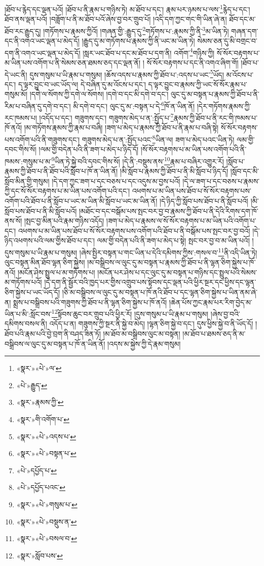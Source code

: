།ཐོབ་པ་རྙེད་དང་ལྡན་པའོ། །ཐོབ་པ་ནི་རྣམ་པ་གཉིས་ཏེ། མ་ཐོབ་པ་དང་། རྣམ་པར་ཉམས་པ་ལས་\footnote{«སྣར་»«པེ་»ལ་}རྙེད་པ་དང་། ཐོབ་ནས་ལྡན་པའོ། །བཟློག་པ་ནི་མ་ཐོབ་པའོ་ཞེས་བྱ་བར་གྲུབ་པོ། །འདི་དག་ཀྱང་གང་གི་ཡིན་ཞེ་ན། ཐོབ་དང་མ་ཐོབ་རང་རྒྱུད་དུ། །གཏོགས་པ་རྣམས་ཀྱིའོ། །གཞན་གྱི་:རྒྱུད་དུ་\footnote{«པེ་»རྒྱུད་}གཏོགས་པ་:རྣམས་ཀྱི་ནི་\footnote{«སྣར་»རྣམས་ཀྱི་}མ་ཡིན་ཏེ། གཞན་དག་དང་ནི་འགའ་ཡང་ལྡན་པ་མེད་དོ། །རྒྱུད་དུ་མ་གཏོགས་པ་རྣམས་ཀྱི་ནི་ཡང་མ་ཡིན་ཏེ། སེམས་ཅན་དུ་མི་བགྲང་བ་དག་ནི་འགའ་ཡང་ལྡན་པ་མེད་དོ། །སླར་ཡང་ཐོབ་པ་དང་མ་ཐོབ་པ་དག་ནི། འགོག་\footnote{«སྣར་»གི་འགོག་པ་}གཉིས་ཀྱི། སོ་སོར་བརྟགས་པ་མ་ཡིན་པས་འགོག་པ་ནི་སེམས་ཅན་ཐམས་ཅད་དང་ལྡན་ནོ། །
སོ་སོར་བརྟགས་པ་དང་ནི་འགའ་ཞིག་གོ། །ཐོབ་པ་དེ་ཡང་ནི། དུས་གསུམ་པ་ཡི་རྣམ་པ་གསུམ། །ཆོས་འདས་པ་རྣམས་ཀྱི་ཐོབ་པ་:འདས་པ་ཡང་\footnote{«སྣར་»«པེ་»འདས་པ་}ཡོད། མ་འོངས་པ་དང་། ད་ལྟར་བྱུང་བ་ཡང་ཡོད་ལ། དེ་བཞིན་དུ་མ་འོངས་པ་དང་། ད་ལྟར་བྱུང་བ་རྣམས་ཀྱི་ཡང་སོ་སོར་རྣམ་པ་གསུམ་མོ། །དགེ་ལ་སོགས་ཀྱི་དགེ་ལ་སོགས། །དགེ་བ་དང་མི་དགེ་བ་དང་། ལུང་དུ་མ་བསྟན་པ་རྣམས་ཀྱི་ཐོབ་པ་ནི་རིམ་པ་བཞིན་དུ་དགེ་བ་དང་། མི་དགེ་བ་དང་། ལུང་དུ་མ་:བསྟན་པ་དེ་\footnote{«སྣར་»«པེ་»བསྟན་པ་}ཁོ་ན་ཡིན་ནོ། །དེར་གཏོགས་རྣམས་ཀྱི་རང་ཁམས་པ། །འདོད་པ་དང་། གཟུགས་དང་། གཟུགས་མེད་པ་ན་:སྤྱོད་པ་\footnote{«པེ་»དཔྱོད་པ་}རྣམས་ཀྱི་ཐོབ་པ་ནི་རང་གི་ཁམས་པ་ཁོ་ནའོ། །མ་གཏོགས་རྣམས་ཀྱི་རྣམ་པ་བཞི། །ཟག་པ་མེད་པ་རྣམས་ཀྱི་ཐོབ་པ་ནི་རྣམ་པ་བཞི་སྟེ། སོ་སོར་བརྟགས་པས་འགོག་པའི་ནི་གཟུགས་དང་། གཟུགས་མེད་པ་ན་:སྤྱོད་པའང་\footnote{«པེ་»དཔྱོད་པའང་}ཡིན་ལ། ཟག་པ་མེད་པའང་ཡིན་ཏེ། ལམ་གྱི་དབང་གིས་སོ། །ལམ་གྱི་བདེན་པའི་ནི་ཟག་པ་མེད་པ་ཉིད་དོ། །སོ་སོར་བརྟགས་པ་མ་ཡིན་པས་འགོག་པའི་ནི་ཁམས་:གསུམ་པ་མ་\footnote{«སྣར་»«པེ་»གསུམ་པ་}ཡིན་ཏེ་སྐྱེ་བའི་དབང་གིས་སོ། །དེ་ནི་:བསྡུས་ནས་\footnote{«སྣར་»«པེ་»བསྡུས་ན་}རྣམ་པ་བཞིར་འགྱུར་རོ། །སློབ་པ་རྣམས་ཀྱི་ཐོབ་པ་ནི་ཐོབ་པའི་སློབ་པ་ཁོ་ན་ཡིན་ནོ། །མི་སློབ་པ་རྣམས་ཀྱི་ཐོབ་པ་ནི་མི་སློབ་པ་ཉིད་དོ། །སློབ་དང་མི་སློབ་མིན་གྱི་གསུམ། །དེ་དག་ཀྱང་ཟག་པ་དང་བཅས་པ་དང་འདུས་མ་བྱས་པའོ། །དེ་ལ་ཟག་པ་དང་བཅས་པ་རྣམས་ཀྱི་དང་སོ་སོར་བརྟགས་པ་མ་ཡིན་པས་འགོག་པའི་དང་། འཕགས་པ་མ་ཡིན་པས་ཐོབ་པ་སོ་སོར་བརྟགས་པས་འགོག་པའི་ཐོབ་པ་ནི་སློབ་པ་ཡང་མ་ཡིན་མི་སློབ་པ་ཡང་མ་ཡིན་ནོ། །དེ་ཉིད་ཀྱི་སློབ་པས་ཐོབ་པ་ནི་སློབ་པའོ། །མི་སློབ་པས་ཐོབ་པ་ནི་མི་སློབ་པའོ། །མཐོང་བ་དང་བསྒོམ་པས་སྤང་བར་བྱ་བ་རྣམས་ཀྱི་ཐོབ་པ་ནི་དེའི་རིགས་དག་ཁོ་ནས་སོ། །སྤང་བྱ་མིན་པའི་རྣམ་གཉིས་འདོད། །ཟག་པ་མེད་པ་རྣམས་ལ་སོ་སོར་བརྟགས་པ་མ་ཡིན་པའི་འགོག་པ་དང་། འཕགས་པ་མ་ཡིན་པས་ཐོབ་པ་སོ་སོར་བརྟགས་པས་འགོག་པའི་ཐོབ་པ་ནི་བསྒོམ་པས་སྤང་བར་བྱ་བའོ། །དེ་ཉིད་འཕགས་པའི་ལམ་གྱིས་ཐོབ་པ་དང་། ལམ་གྱི་བདེན་པའི་ནི་ཟག་པ་མེད་པ་སྟེ། སྤང་བར་བྱ་བ་མ་ཡིན་པའོ། །དུས་གསུམ་པ་ཡི་རྣམ་པ་གསུམ། །ཞེས་སྤྱིར་བསྟན་པ་གང་ཡིན་པ་དེའི་དམིགས་ཀྱིས་:གསལ་བ་\footnote{«སྣར་»«པེ་»བསལ་བ་}ནི་འདི་ཡིན་ཏེ། ལུང་བསྟན་མིན་ཐོབ་ལྷན་ཅིག་སྐྱེས། །མ་བསྒྲིབས་ལ་ལུང་དུ་མ་བསྟན་པ་རྣམས་ཀྱི་ཐོབ་པ་ནི་ལྷན་ཅིག་སྐྱེས་པ་ཁོ་ནའོ། །མངོན་ཤེས་སྤྲུལ་པ་མ་གཏོགས་པ། །མངོན་པར་ཤེས་པ་དང་ལུང་དུ་མ་བསྟན་པ་གཉིས་དང་སྤྲུལ་པའི་སེམས་མ་གཏོགས་པའོ། །དེ་དག་ནི་སྦྱོར་བའི་ཁྱད་པར་གྱིས་འགྲུབ་པས་སྟོབས་དང་ལྡན་པའི་ཕྱིར་སྔར་དང་ཕྱིས་དང་ལྷན་ཅིག་སྐྱེས་པ་ཡང་ཡོད་དོ། །ཅི་མ་བསྒྲིབས་ལ་ལུང་དུ་མ་བསྟན་པ་ཁོ་ནའི་ཐོབ་པ་དང་ལྷན་ཅིག་སྐྱེས་པ་ཡིན་ནམ་ཞེ་ན། སྨྲས་པ་བསྒྲིབས་པའི་གཟུགས་ཀྱི་ཐོབ་པ་ནི་ལྷན་ཅིག་སྐྱེས་པ་ཁོ་ནའོ། །ཆེན་པོས་ཀྱང་རྣམ་པར་རིག་བྱེད་མ་ཡིན་པ་མི་:སློང་བས་\footnote{«སྣར་»སློབ་པས་}སྟོབས་ཆུང་བར་གྲུབ་པའི་ཕྱིར་རོ། །དུས་གསུམ་པ་ཡི་རྣམ་པ་གསུམ། །ཞེས་བྱ་བའི་དམིགས་བསལ་ནི། འདོད་པ་ན། གཟུགས་ཀྱི་སྔར་ནི་སྐྱེ་བ་མེད། །ལྷན་ཅིག་སྐྱེ་བ་དང་། དུས་ཕྱིས་སྐྱེ་བ་ནི་ཡོད་དོ། །ཐོབ་པའི་རྣམ་པའི་བྱེ་བྲག་ནི་བཤད་ཟིན་ཏོ། །མ་ཐོབ་མ་བསྒྲིབས་ལུང་མ་བསྟན། །མ་ཐོབ་པ་ཐམས་ཅད་ནི་མ་བསྒྲིབས་ལ་ལུང་དུ་མ་བསྟན་པ་ཁོ་ན་ཡིན་ནོ། །འདས་མ་སྐྱེས་ཀྱི་དེ་རྣམ་གསུམ། 